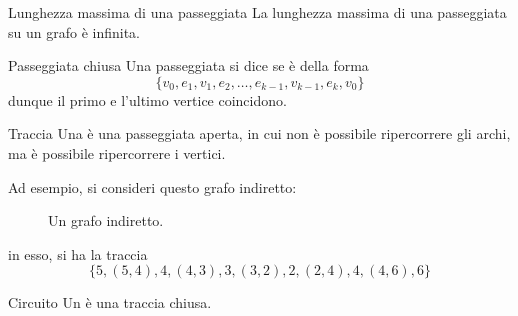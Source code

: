 \documentclass[a4paper, 12pt]{report}
\begin{document}
    \begin{framedobs}{Lunghezza massima di una passeggiata}
        La lunghezza massima di una passeggiata su un grafo è infinita.
    \end{framedobs}

    \begin{frameddefn}{Passeggiata chiusa}
        Una passeggiata si dice  se è della forma $$\{v_0, e_1, v_1, e_2, \ldots , e_{k - 1}, v_{k - 1}, e_k, v_0\}$$ dunque il primo e l'ultimo vertice coincidono. 
    \end{frameddefn}

    \begin{frameddefn}{Traccia}
        Una  è una passeggiata aperta, in cui non è possibile ripercorrere gli archi, ma è possibile ripercorrere i vertici.
    \end{frameddefn}

    \begin{example}
        Ad esempio, si consideri questo grafo indiretto:

        \begin{figure}[H]
            \centering
            \caption{Un grafo indiretto.}
        \end{figure}

        in esso, si ha la traccia $$\{5, (5,4), 4, (4,3), 3, (3, 2), 2, (2,4), 4, (4, 6), 6\}$$
    \end{example}

    \begin{frameddefn}{Circuito}
        Un  è una traccia chiusa.
    \end{frameddefn}
\end{document}
